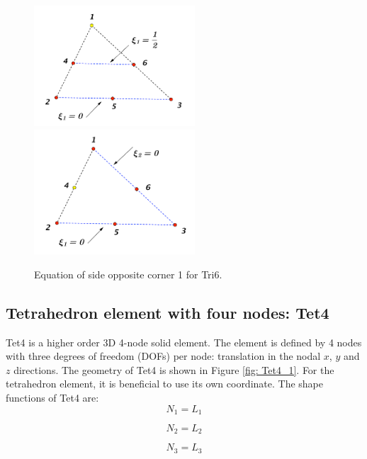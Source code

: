 \begin{figure}[h]
	\begin{center}
		\includegraphics[width=6cm,clip]{Tri6_2.pdf}		
		\includegraphics[width=6cm,clip]{Tri6_3.pdf}		
		\caption{Equation of side opposite corner 1 for Tri6.} \label{fig: Tri6_2}
		
	\end{center} 
\end{figure}


\subsection{Tetrahedron element with four nodes: Tet4}
Tet4 is a higher order 3D 4-node solid element. The element is defined by 4 nodes with three degrees of freedom (DOFs) per node: translation in the nodal $x$, $y$ and $z$ directions. The geometry of Tet4 is shown in Figure \ref{fig: Tet4_1}. For the tetrahedron element, it is beneficial to use its own coordinate. The shape functions of Tet4 are:
\begin{equation}
N_1 = L_1
\end{equation}

\begin{equation}
N_2 = L_2
\end{equation}

\begin{equation}
N_3 = L_3
\end{equation}

